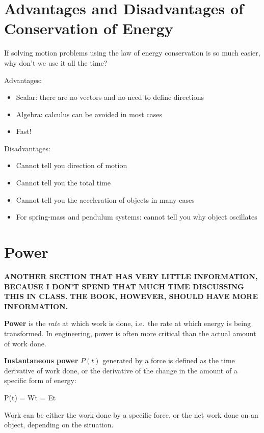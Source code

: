 \section{Advantages and Disadvantages of Conservation of Energy}
If solving motion problems using the law of energy conservation is so much
easier, why don't we use it all the time?

Advantages:
\begin{itemize}
\item Scalar: there are no vectors and no need to define directions
\item Algebra: calculus can be avoided in most cases
\item Fast!
\end{itemize}

Disadvantages:
\begin{itemize}
\item Cannot tell you direction of motion
\item Cannot tell you the total time
\item Cannot tell you the acceleration of objects in many cases
\item For spring-mass and pendulum systems: cannot tell you why
  object oscillates
\end{itemize}



\section{Power}

\textbf{ANOTHER SECTION THAT HAS VERY LITTLE INFORMATION, BECAUSE I DON'T SPEND
  THAT MUCH TIME DISCUSSING THIS IN CLASS. THE BOOK, HOWEVER, SHOULD HAVE MORE
  INFORMATION.}

\textbf{Power} is the \emph{rate} at which work is done, i.e.\ the rate at
which energy is being transformed. In engineering, power is often more critical
than the actual amount of work done.

\textbf{Instantaneous power} $P(t)$ generated by a force is defined as the time
derivative of work done, or the derivative of the change in the amount of a
specific form of energy:
\begin{important-equation}
  P(t) = \diff Wt = \diff Et
\end{important-equation}
Work can be either the work done by a specific force, or the net work done on
an object, depending on the situation.

